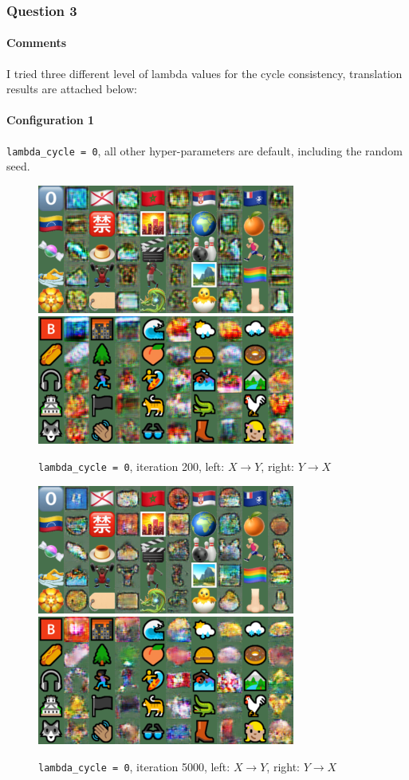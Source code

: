 \documentclass{article}
\begin{document}
	\subsubsection{Question 3}
	\paragraph{Comments} I tried three different level of lambda values for the cycle consistency, translation results are attached below:
	\paragraph{Configuration 1} \texttt{lambda\_cycle = 0}, all other hyper-parameters are default, including the random seed.
	\begin{figure}[H]
		\centering
		\caption{ \texttt{lambda\_cycle = 0}, iteration 200, left: $X \to Y$, right: $Y \to X$}
		\includegraphics[width=0.45\linewidth]{./samples_cyclegan_Q3_lambda0/sample-000200-X-Y.png}
		\includegraphics[width=0.45\linewidth]{./samples_cyclegan_Q3_lambda0/sample-000200-Y-X.png}
	\end{figure}
	\begin{figure}[H]
		\centering
		\caption{ \texttt{lambda\_cycle = 0}, iteration 5000, left: $X \to Y$, right: $Y \to X$}
		\includegraphics[width=0.45\linewidth]{./samples_cyclegan_Q3_lambda0/sample-005000-X-Y.png}
		\includegraphics[width=0.45\linewidth]{./samples_cyclegan_Q3_lambda0/sample-005000-Y-X.png}
	\end{figure}
\end{document}
